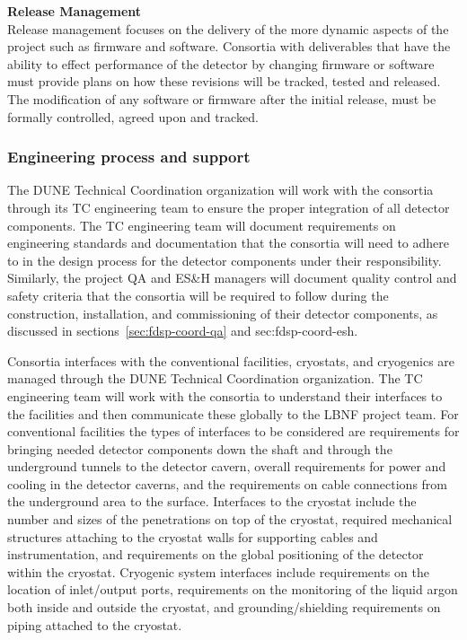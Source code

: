 {\bf Release Management}\\
Release management focuses on the delivery of the more dynamic aspects
of the project such as firmware and software.  Consortia with
deliverables that have the ability to effect performance of the
detector by changing firmware or software must provide plans on how
these revisions will be tracked, tested and released.  The
modification of any software or firmware after the initial release,
must be formally controlled, agreed upon and tracked.


\subsubsection{Engineering process and support}
\label{sec:fdsp-coord-integ-engr-proc}
 

The DUNE Technical Coordination organization will work with the
consortia through its TC engineering team to ensure the proper
integration of all detector components.  The TC engineering team
will document requirements on engineering standards and documentation
that the consortia will need to adhere to in the design process for
the detector components under their responsibility.  Similarly, the
project QA and ES\&H managers will document quality control and safety
criteria that the consortia will be required to follow during the
construction, installation, and commissioning of their detector
components, as discussed in sections~\ref{sec:fdsp-coord-qa} and {sec:fdsp-coord-esh}.


Consortia interfaces with the conventional facilities, cryostats, and
cryogenics are managed through the DUNE Technical Coordination
organization.  The TC engineering team will work with the
consortia to understand their interfaces to the facilities and then
communicate these globally to the LBNF project team.  For conventional
facilities the types of interfaces to be considered are requirements
for bringing needed detector components down the shaft and through the
underground tunnels to the detector cavern, overall requirements for
power and cooling in the detector caverns, and the requirements on
cable connections from the underground area to the surface.
Interfaces to the cryostat include the number and sizes of the
penetrations on top of the cryostat, required mechanical structures
attaching to the cryostat walls for supporting cables and
instrumentation, and requirements on the global positioning of the
detector within the cryostat.  Cryogenic system interfaces include
requirements on the location of inlet/output ports, requirements on
the monitoring of the liquid argon both inside and outside the
cryostat, and grounding/shielding requirements on piping attached to
the cryostat.

